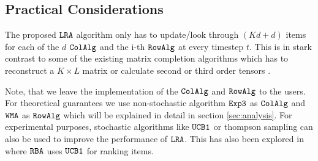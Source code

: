 \subsection{Practical Considerations}
\label{sec:practical considerations}

The proposed ${\tt LRA}$ algorithm only has to update/look through $(Kd + d)$ items for each of the $d$ ${\tt ColAlg}$ and the i-th ${\tt RowAlg}$ at every timestep $t$. This is in stark contrast to some of the existing matrix completion algorithms which has to reconstruct a $K\times L$ matrix \citep{sen2016contextual} or calculate second or third order tensors \citep{gopalan2016low}. 




Note, that we leave the implementation of the ${\tt ColAlg}$ and ${\tt RowAlg}$ to the users. For theoretical guarantees we use non-stochastic algorithm ${\tt Exp3}$ as ${\tt ColAlg}$ and ${\tt WMA}$ as ${\tt RowAlg}$ which will be explained in detail in section \cref{sec:analysis}. For experimental purposes, stochastic algorithms like ${\tt UCB1}$ or thompson sampling can also be used to improve the performance of ${\tt LRA}$. This has also been explored in \citet{radlinski2008learning} where ${\tt RBA}$ uses ${\tt UCB1}$ for ranking items.


